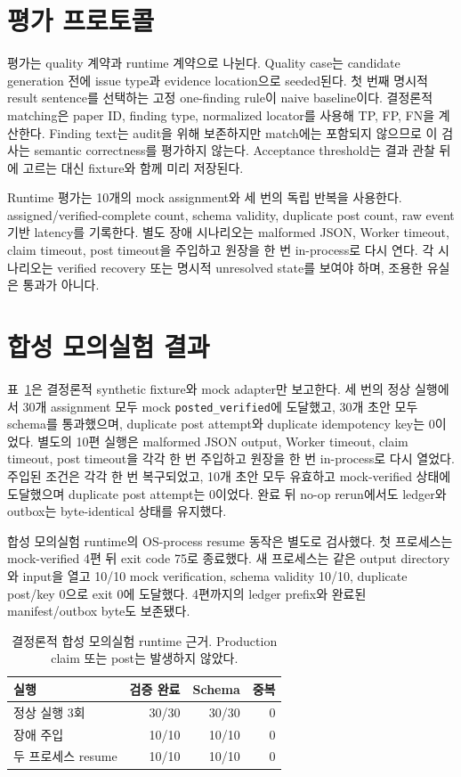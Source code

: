 \documentclass[11pt,a4paper]{article}
\begin{document}
\section{평가 프로토콜}

평가는 quality 계약과 runtime 계약으로 나뉜다. Quality case는 candidate
generation 전에 issue type과 evidence location으로 seeded된다. 첫 번째 명시적
result sentence를 선택하는 고정 one-finding rule이 naive baseline이다.
결정론적 matching은 paper ID, finding type, normalized locator를 사용해 TP, FP,
FN을 계산한다. Finding text는 audit을 위해 보존하지만 match에는 포함되지
않으므로 이 검사는 semantic correctness를 평가하지 않는다. Acceptance
threshold는 결과 관찰 뒤에 고르는 대신 fixture와 함께 미리 저장된다.

Runtime 평가는 10개의 mock assignment와 세 번의 독립 반복을 사용한다.
assigned/verified-complete count, schema validity, duplicate post count, raw event
기반 latency를 기록한다. 별도 장애 시나리오는 malformed JSON, Worker timeout,
claim timeout, post timeout을 주입하고 원장을 한 번 in-process로 다시 연다.
각 시나리오는 verified recovery 또는 명시적 unresolved state를 보여야 하며,
조용한 유실은 통과가 아니다.

\section{합성 모의실험 결과}

표~\ref{tab:runtime}은 결정론적 synthetic fixture와 mock adapter만 보고한다.
세 번의 정상 실행에서 30개 assignment 모두 mock
\texttt{posted\_verified}에 도달했고, 30개 초안 모두 schema를 통과했으며,
duplicate post attempt와 duplicate idempotency key는 0이었다. 별도의 10편
실행은 malformed JSON output, Worker timeout, claim timeout, post timeout을
각각 한 번 주입하고 원장을 한 번 in-process로 다시 열었다. 주입된 조건은
각각 한 번 복구되었고, 10개 초안 모두 유효하고 mock-verified 상태에
도달했으며 duplicate post attempt는 0이었다. 완료 뒤 no-op rerun에서도
ledger와 outbox는 byte-identical 상태를 유지했다.

합성 모의실험 runtime의 OS-process resume 동작은 별도로 검사했다. 첫
프로세스는 mock-verified 4편 뒤 exit code 75로 종료했다. 새 프로세스는 같은
output directory와 input을 열고 10/10 mock verification, schema validity 10/10,
duplicate post/key 0으로 exit 0에 도달했다. 4편까지의 ledger prefix와 완료된
manifest/outbox byte도 보존됐다.

\begin{table}[H]
  \caption{결정론적 합성 모의실험 runtime 근거. Production claim 또는 post는
  발생하지 않았다.}
  \label{tab:runtime}
  \centering
  \small
  \begin{tabular}{@{}lrrr@{}}
    \toprule
    실행 & 검증 완료 & Schema & 중복 \\
    \midrule
    정상 실행 3회 & 30/30 & 30/30 & 0 \\
    장애 주입 & 10/10 & 10/10 & 0 \\
    두 프로세스 resume & 10/10 & 10/10 & 0 \\
    \bottomrule
  \end{tabular}
\end{table}
\end{document}
